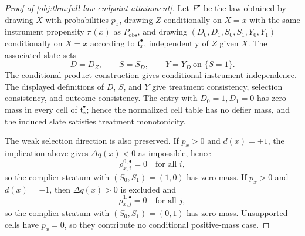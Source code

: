 \documentclass[11pt]{article}
\begin{document}
\begin{proof}[Proof of \cref{obj:thm:full-law-endpoint-attainment}]
Let \(P^\bullet\) be the law obtained by drawing \(X\) with probabilities \(p_x\), drawing \(Z\) conditionally on \(X=x\) with the same instrument propensity \(\pi(x)\) as \(P_{\mathrm{obs}}\), and drawing \((D_0,D_1,S_0,S_1,Y_0,Y_1)\) conditionally on \(X=x\) according to \(\mathfrak t^\bullet_x\), independently of \(Z\) given \(X\).  The associated slate sets
\[
D=D_Z,\qquad S=S_D,\qquad Y=Y_D\ \text{on }\{S=1\}.
\]
The conditional product construction gives conditional instrument independence. %
The displayed definitions of \(D\), \(S\), and \(Y\) give treatment consistency, selection consistency, and outcome consistency. %
The entry with \(D_0=1,D_1=0\) has zero mass in every cell of \(\mathfrak t^\bullet_x\); hence the normalized cell table has no defier mass, and the induced slate satisfies treatment monotonicity. %

The weak selection direction is also preserved.  If \(p_x>0\) and \(d(x)=+1\), the implication above gives \(\Delta q(x)<0\) as impossible, hence
\[
\rho^{0,\bullet}_{x,i}=0\quad\text{for all }i,
\]
so the complier stratum with \((S_0,S_1)=(1,0)\) has zero mass.  If \(p_x>0\) and \(d(x)=-1\), then \(\Delta q(x)>0\) is excluded and
\[
\rho^{1,\bullet}_{x,j}=0\quad\text{for all }j,
\]
so the complier stratum with \((S_0,S_1)=(0,1)\) has zero mass.  Unsupported cells have \(p_x=0\), so they contribute no conditional positive-mass case. %


\end{proof}
\end{document}
